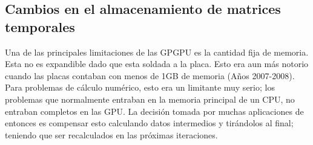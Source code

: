 %
%
%


\subsection{Cambios en el almacenamiento de matrices temporales}
Una de las principales limitaciones de las GPGPU es la cantidad fija de memoria. Esta no es
expandible dado que esta soldada a la placa. Esto era aun m\'as notorio cuando las placas
contaban con menos de 1GB de memoria (A\~nos 2007-2008).
Para problemas de c\'alculo num\'erico, esto era un limitante muy serio; los problemas que
normalmente entraban en la memoria principal de un CPU, no entraban completos en las GPU.
La decisi\'on tomada por muchas aplicaciones de entonces es compensar esto calculando
datos intermedios y tir\'andolos al final; teniendo que ser recalculados en las pr\'oximas iteraciones.

